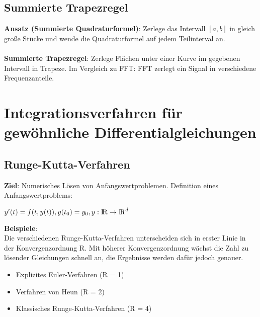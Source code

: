 \documentclass[10pt,a4paper]{article}
\def\realnumbers{{\rm I\!R}}
\begin{document}
	\subsection{Summierte Trapezregel}
	\textbf{Ansatz (Summierte Quadraturformel)}: Zerlege das Intervall $[a, b]$ in gleich große Stücke und wende die Quadraturformel auf jedem Teilinterval an.\\\\
	\textbf{Summierte Trapezregel}: Zerlege Flächen unter einer Kurve im gegebenen Intervall in Trapeze. Im Vergleich zu FFT: FFT zerlegt ein Signal in verschiedene Frequenzanteile.
	\newpage
	\section{Integrationsverfahren für gewöhnliche Differentialgleichungen}
	\subsection{Runge-Kutta-Verfahren}
	\textbf{Ziel}: Numerisches Lösen von Anfangswertproblemen. Definition eines Anfangswertproblems:
	\begin{center} 
		$y'(t) = f(t, y(t)), y(t_0) = y_0, y: \realnumbers \rightarrow \realnumbers^d$
	\end{center}
	\textbf{Beispiele}:\\
	Die verschiedenen Runge-Kutta-Verfahren unterscheiden sich in erster Linie in der Konvergenzordnung R. Mit höherer Konvergenzordnung wächst die Zahl zu lösender Gleichungen schnell an, die Ergebnisse werden dafür jedoch genauer.
	\begin{itemize}
		\item Explizites Euler-Verfahren (R = 1)
		\item Verfahren von Heun (R = 2)
		\item Klassisches Runge-Kutta-Verfahren (R = 4)
	\end{itemize}
\end{document}
